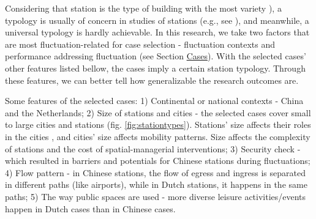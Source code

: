 \documentclass[]{article}
\begin{document}
Considering that station is the type of building with the most variety \citep[p.~52]{richardsRailwayStationSocial1986}), a typology is usually of concern in studies of stations (e.g., see \citep{petersTrainStationArea2012}), and meanwhile, a universal typology is hardly achievable. In this research, we take two factors that are most fluctuation-related for case selection - fluctuation contexts and performance addressing fluctuation (see Section \hyperref[Cases]{Cases}). With the selected cases' other features listed bellow, the cases imply a certain station typology. Through these features, we can better tell how generalizable the research outcomes are.

Some features of the selected cases:
1) Continental or national contexts - China and the Netherlands; 
2) Size of stations and cities - the selected cases cover small to large cities and stations (fig. \ref{fig:stationtypes}). Stations' size affects their roles in the cities \citep{vanackerSpatialImpactTrain2021}, and cities' size affects mobility patterns. Size affects the complexity of stations and the cost of spatial-managerial interventions;
3) Security check - which resulted in barriers and potentials for Chinese stations during fluctuations; 
4) Flow pattern - in Chinese stations, the flow of egress and ingress is separated in different paths (like airports), while in Dutch stations, it happens in the same paths; 
5) The way public spaces are used - more diverse leisure activities/events happen in Dutch cases than in Chinese cases.
\end{document}
